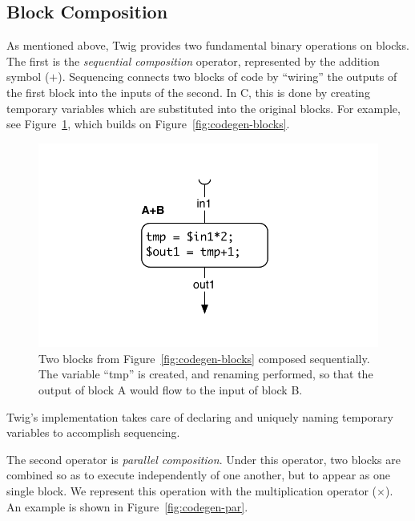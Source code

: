 \subsection{Block Composition}

As mentioned above, Twig provides two fundamental binary operations on blocks. The first is the \emph{sequential composition} operator, represented by the addition symbol ($+$). Sequencing connects two blocks of code by ``wiring'' the outputs of the first block into the inputs of the second. In C, this is done by creating temporary variables which are substituted into the original blocks. For example, see Figure~\ref{fig:codegen-seq}, which builds on Figure~\ref{fig:codegen-blocks}.

\begin{figure}[ht]
\centering
\includegraphics[width=\columnwidth]{images/code-gen2}
\caption{Two blocks from Figure~\ref{fig:codegen-blocks} composed sequentially. The variable ``tmp'' is created, and renaming performed, so that the output of block A would flow to the input of block B.}
\label{fig:codegen-seq}
\end{figure}

Twig's implementation takes care of declaring and uniquely naming temporary variables to accomplish sequencing.

The second operator is \emph{parallel composition}. Under this operator, two blocks are combined so as to execute independently of one another, but to appear as one single block. We represent this operation with the multiplication operator ($\times$). An example is shown in Figure~\ref{fig:codegen-par}.

